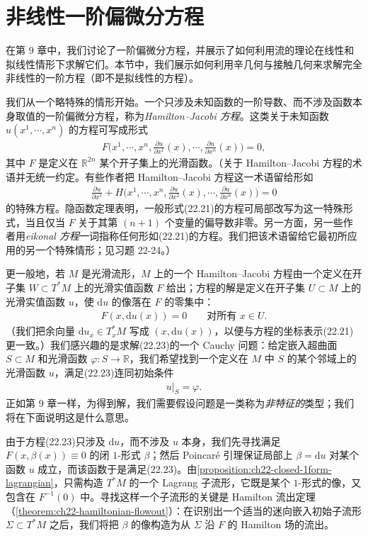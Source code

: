 \documentclass[../../main.tex]{subfiles}
\begin{document}
\section{非线性一阶偏微分方程}\label{section:ch22-nonlinear-pdes}

在第 9 章中，我们讨论了一阶偏微分方程，并展示了如何利用流的理论在线性和拟线性情形下求解它们。本节中，我们展示如何利用辛几何与接触几何来求解完全非线性的一阶方程（即不是拟线性的方程）。

我们从一个略特殊的情形开始。一个只涉及未知函数的一阶导数、而不涉及函数本身取值的一阶偏微分方程，称为\emph{Hamilton--Jacobi 方程}。这类关于未知函数 $u(x^1,\cdots ,x^n)$ 的方程可写成形式
\begin{align}
F\big(x^1,\cdots ,x^n,\tfrac{\partial u}{\partial x^1}(x),\cdots ,\tfrac{\partial u}{\partial x^n}(x)\big)=0,
\end{align}
其中 $F$ 是定义在 $\mathbb{R}^{2n}$ 某个开子集上的光滑函数。（关于 Hamilton--Jacobi 方程的术语并无统一约定。有些作者把 Hamilton--Jacobi 方程这一术语留给形如
\begin{align}
\frac{\partial u}{\partial x^1}+H\big(x^1,\cdots ,x^n,\tfrac{\partial u}{\partial x^2}(x),\cdots ,\tfrac{\partial u}{\partial x^n}(x)\big)=0
\end{align}
的特殊方程。隐函数定理表明，一般形式(22.21)的方程可局部改写为这一特殊形式，当且仅当 $F$ 关于其第 $(n+1)$ 个变量的偏导数非零。另一方面，另一些作者用\emph{eikonal 方程}一词指称任何形如(22.21)的方程。我们把该术语留给它最初所应用的另一个特殊情形；见习题 22-24。）

更一般地，若 $M$ 是光滑流形，$M$ 上的一个 Hamilton--Jacobi 方程由一个定义在开子集 $W\subset T^*M$ 上的光滑实值函数 $F$ 给出；方程的解是定义在开子集 $U\subset M$ 上的光滑实值函数 $u$，使 $\mathrm{d}u$ 的像落在 $F$ 的零集中：
\begin{align}
F(x,\mathrm{d}u(x))=0\qquad\text{对所有 }x\in U.
\end{align}
（我们把余向量 $\mathrm{d}u_x\in T^*_xM$ 写成 $(x,\mathrm{d}u(x))$，以便与方程的坐标表示(22.21)更一致。）我们感兴趣的是求解(22.23)的一个 Cauchy 问题：给定嵌入超曲面 $S\subset M$ 和光滑函数 $\varphi:S\to\mathbb R$，我们希望找到一个定义在 $M$ 中 $S$ 的某个邻域上的光滑函数 $u$，满足(22.23)连同初始条件
\begin{align}
u|_S=\varphi.
\end{align}
正如第 9 章一样，为得到解，我们需要假设问题是一类称为\emph{非特征的}类型；我们将在下面说明这是什么意思。

由于方程(22.23)只涉及 $\mathrm{d}u$，而不涉及 $u$ 本身，我们先寻找满足 $F(x,\beta(x))\equiv0$ 的闭 $1$-形式 $\beta$；然后 Poincar\'e 引理保证局部上 $\beta=\mathrm{d}u$ 对某个函数 $u$ 成立，而该函数于是满足(22.23)。由\cref{proposition:ch22-closed-1form-lagrangian}，只需构造 $T^*M$ 的一个 Lagrang 子流形，它既是某个 $1$-形式的像，又包含在 $F^{-1}(0)$ 中。寻找这样一个子流形的关键是 Hamilton 流出定理（\cref{theorem:ch22-hamiltonian-flowout}）：在识别出一个适当的迷向嵌入初始子流形 $\Sigma\subset T^*M$ 之后，我们将把 $\beta$ 的像构造为从 $\Sigma$ 沿 $F$ 的 Hamilton 场的流出。
\end{document}
